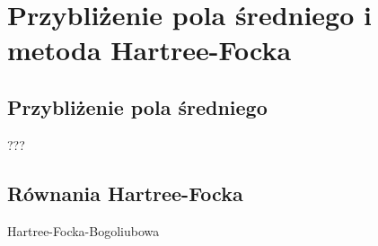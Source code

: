 \section{Przybliżenie pola średniego i metoda Hartree-Focka}


\subsection{Przybliżenie pola średniego}

???


\subsection{Równania Hartree-Focka}

Hartree-Focka-Bogoliubowa